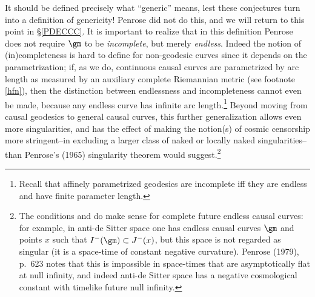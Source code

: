 \documentclass[12pt]{article}
\begin{document}
It should be defined precisely what ``generic''  means, lest these conjectures turn into a definition of genericity! Penrose did not do this, and we will return to this point in \S\ref{PDECCC}. It is important to realize that in this definition Penrose does not require $\gm$ to be \emph{incomplete}, but merely \emph{endless}. Indeed the notion of (in)completeness is hard to define for non-geodesic curves since it depends on the parametrization;  if, as we do, continuous causal curves are parametrized by arc length as measured by an auxiliary complete Riemannian metric (see footnote \ref{hfn}), then the distinction between endlessness and incompleteness cannot even be made, because any endless curve has infinite arc length.\footnote{Recall that affinely parametrized geodesics are incomplete iff they are endless and have finite parameter length.} Beyond moving from causal geodesics to general  causal curves, this further generalization allows even more singularities, and has the effect of making the notion(s) of cosmic censorship more stringent--in excluding a larger class of naked or locally naked singularities--than Penrose's (1965)  singularity theorem would suggest.\footnote{The conditions 
and  do make  sense for complete future endless causal curves: for example,  in anti-de Sitter space one has   endless causal curves $\gm$ and points $x$ such that $I^-(\gm)\subset J^-(x)$, but this space is not regarded as singular (it is a  space-time of constant negative curvature).  
Penrose (1979), p.\ 623 notes that this is impossible in space-times that are asymptotically flat at null infinity, and indeed
 anti-de Sitter space has a negative cosmological constant with timelike future null infinity. 
 }
\end{document}
